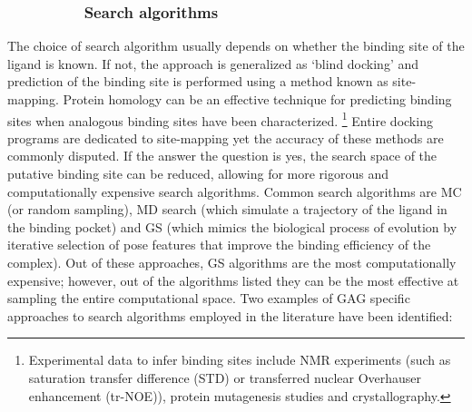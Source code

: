 \documentclass[journal=jctcce,manuscript=article]{achemso}
\begin{document}
{{}

\subsubsection*{~~~~~~~~~Search algorithms}

The choice of search algorithm usually depends on whether the binding site of the ligand is known. If not, the approach is generalized as `blind docking' and prediction of the binding site is performed using a method known as site-mapping. Protein homology can be an effective technique for predicting binding sites when analogous binding sites have been characterized.\cite{Gandhi2012PredictionBMPs, Agostino2014DevelopmentGlycosaminoglycans, Mottarella2014DockingProteins, Hileman1998Glycosaminoglycan-proteinProteins}
\footnote{Experimental data to infer binding sites include NMR experiments\cite{Pomin2018Glycosaminoglycan-ProteinSpectroscopy} (such as saturation transfer difference (STD)\cite{Haselhorst2007STDCore} or transferred nuclear Overhauser enhancement (tr-NOE)\cite{Mobius2013InvestigationApproach}), protein mutagenesis studies\cite{WeijunHuang2001ActiveMutagenesis} and crystallography.\cite{Huang1999CrystalResolution}}
Entire docking programs are dedicated to site-mapping\cite{Mottarella2014DockingProteins, Peters1996TheCriteria, Comeau2007ClusPro:Server} yet the accuracy of these methods are commonly disputed.\cite{Sankaranarayanan2018SoAgain} 
If the answer the question is yes, the search space of the putative binding site can be reduced, allowing for more rigorous and computationally expensive search algorithms.\cite{Halperin2002PrinciplesFunctions} 
Common search algorithms are \ac{MC} (or random sampling), \ac{MD} search (which simulate a trajectory of the ligand in the binding pocket) and \ac{GS} (which mimics the biological process of evolution by iterative selection of pose features that improve the binding efficiency of the complex). 
Out of these approaches, \Ac{GS} algorithms are the most computationally expensive; however, out of the algorithms listed they can be the most effective at sampling the entire computational space.\cite{Morris1639AutomatedFunction, Halperin2002PrinciplesFunctions}
Two examples of \ac{GAG} specific approaches to search algorithms employed in the literature have been identified:

}
\end{document}
